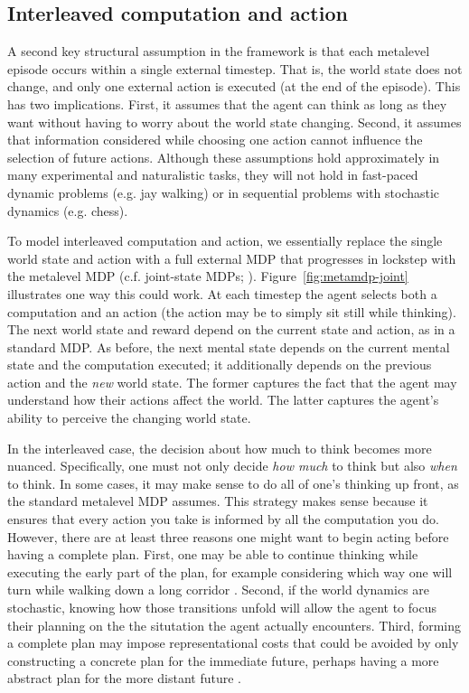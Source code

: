 \subsection{Interleaved computation and action}

A second key structural assumption in the framework is that each metalevel episode occurs within a single external timestep. That is, the world state does not change, and only one external action is executed (at the end of the episode). This has two implications. First, it assumes that the agent can think as long as they want without having to worry about the world state changing. Second, it assumes that information considered while choosing one action cannot influence the selection of future actions. Although these assumptions hold approximately in many experimental and naturalistic tasks, they will not hold in fast-paced dynamic problems (e.g. jay walking) or in sequential problems with stochastic dynamics (e.g. chess).

To model interleaved computation and action, we essentially replace the single world state and action with a full external MDP that progresses in lockstep with the metalevel MDP (c.f. joint-state MDPs; \citealp{russell1991right,parr1998reinforcement,hay2016principles}). Figure~\ref{fig:metamdp-joint} illustrates one way this could work. At each timestep the agent selects both a computation and an action (the action may be to simply sit still while thinking). The next world state and reward depend on the current state and action, as in a standard MDP. As before, the next mental state depends on the current mental state and the computation executed; it additionally depends on the previous action and the \emph{new} world state. The former captures the fact that the agent may understand how their actions affect the world. The latter captures the agent's ability to perceive the changing world state.

In the interleaved case, the decision about how much to think becomes more nuanced. Specifically, one must not only decide \emph{how much} to think but also \emph{when} to think. In some cases, it may make sense to do all of one's thinking up front, as the standard metalevel MDP assumes. This strategy makes sense because it ensures that every action you take is informed by all the computation you do. However, there are at least three reasons one might want to begin acting before having a complete plan. First, one may be able to continue thinking while executing the early part of the plan, for example considering which way one will turn while walking down a long corridor \citep{oceallaigh2015metareasoning}. Second, if the world dynamics are stochastic, knowing how those transitions unfold will allow the agent to focus their planning on the the situtation the agent actually encounters. Third, forming a complete plan may impose representational costs that could be avoided by only constructing a concrete plan for the immediate future, perhaps having a more abstract plan for the more distant future \citep{ho2020efficiency}.

